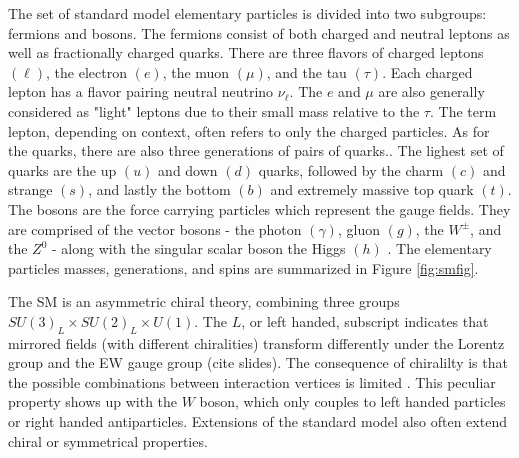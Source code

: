 The set of standard model elementary particles is divided into two subgroups: fermions and bosons.  The fermions consist of both charged and neutral leptons as well as fractionally charged quarks. There are three flavors of charged leptons $(\ell)$, the electron $(e)$, the muon $(\mu)$, and the tau $(\tau)$. Each charged lepton has a flavor pairing neutral neutrino $\nu_\ell$. The $e$ and $\mu$ are also generally considered as "light" leptons due to their small mass relative to the $\tau$. The term lepton, depending on context, often refers to only the charged particles. As for the quarks, there are also three generations of pairs of quarks.. The lighest set of quarks are the up $(u)$ and down $(d)$ quarks, followed by the charm $(c)$ and strange $(s)$, and lastly the bottom $(b)$ and extremely massive top quark $(t)$.  The bosons are the force carrying particles which represent the gauge fields. They are comprised of the vector bosons - the photon $(\gamma)$, gluon $(g)$, the $W^\pm$, and the $Z^0$ - along with the singular scalar boson the Higgs $(h)$ \cite{ParticleDataGroup:2020ssz}. The elementary particles masses, generations, and spins are summarized in Figure \ref{fig:smfig}.






The SM is an asymmetric chiral theory, combining three groups $SU(3)_L \times SU(2)_L \times U(1)$. The $L$, or left handed, subscript indicates that mirrored fields (with different chiralities)  transform differently under the Lorentz group and the EW gauge group (cite slides).  The consequence of chiralilty is that the possible combinations between interaction vertices is limited \cite{Thomson:2013zua}. This peculiar property shows up with the $W$ boson, which only couples to left handed particles or right handed antiparticles. Extensions of the standard model also often extend chiral or symmetrical properties.  %


